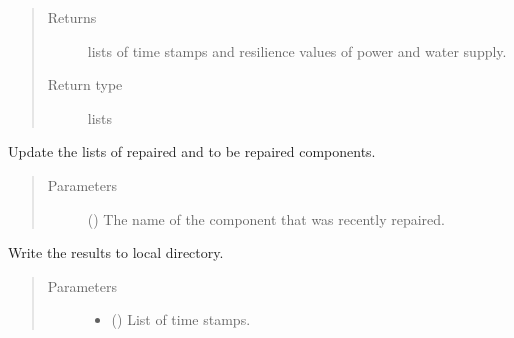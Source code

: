 \documentclass[letterpaper,10pt,english]{sphinxmanual}
\begin{document}
\begin{fulllineitems}
\begin{fulllineitems}
\begin{quote}
\begin{description}
\item[{Returns}] \leavevmode
\sphinxAtStartPar
lists of time stamps and resilience values of power and water supply.

\item[{Return type}] \leavevmode
\sphinxAtStartPar
lists

\end{description}\end{quote}

\end{fulllineitems}


\begin{fulllineitems}
\label{\detokenize{apidoc:dreaminsg_integrated_model.src.simulation.NetworkSimulation.update_repaired_components}}
\sphinxAtStartPar
Update the lists of repaired and to be repaired components.
\begin{quote}\begin{description}
\item[{Parameters}] \leavevmode
\sphinxAtStartPar
{} () \textendash{} The name of the component that was recently repaired.

\end{description}\end{quote}

\end{fulllineitems}


\begin{fulllineitems}
\label{\detokenize{apidoc:dreaminsg_integrated_model.src.simulation.NetworkSimulation.write_results}}
\sphinxAtStartPar
Write the results to local directory.
\begin{quote}\begin{description}
\item[{Parameters}] \leavevmode\begin{itemize}
\item {} 
\sphinxAtStartPar
{} () \textendash{} List of time stamps.


\end{itemize}
\end{description}
\end{quote}
\end{fulllineitems}
\end{fulllineitems}
\end{document}
